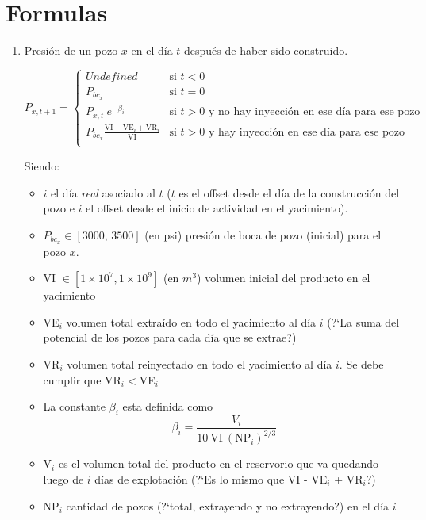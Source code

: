 \section{Formulas}

\begin{enumerate}
 \item Presi\'on de un pozo $x$ en el d\'ia $t$ despu\'es de haber sido construido. 
 
  $$
    P_{x,{t+1}} = \left\{
    \begin{array}{cl}
    \textit{Undefined}	& \mbox{si } t < 0 \\
    P_{bc_x} 		& \mbox{si } t = 0 \\
    P_{x,t} \ e^{-\beta_i}	& \mbox{si } t > 0 \text{ y no hay inyecci\'on en ese d\'ia para ese pozo} \\
    P_{bc_x} \frac{\text{VI} - \text{VE}_i + \text{VR}_i}{\text{VI}} & \mbox{si } t > 0 \text{ y hay inyecci\'on en ese d\'ia para ese pozo} \\
    \end{array}\right.
    $$

 Siendo:
 
 \begin{itemize}
  \item $i$ el d\'ia \textit{real} asociado al $t$ ($t$ es el offset desde el d\'ia de la construcci\'on del pozo e $i$ el offset desde el inicio de actividad en el yacimiento). 
  \item $P_{bc_x}\in[\text{3000, 3500}]$ (en psi) presi\'on de boca de pozo (inicial) para el pozo $x$.
  \item VI $\in[1\times 10^7, 1\times 10^9]$ (en $m^3$) volumen inicial del producto en el yacimiento
  \item VE$_i$ volumen total extra\'ido en todo el yacimiento al d\'ia $i$ (?`La suma del potencial de los pozos para cada d\'ia que se extrae?)
  \item VR$_i$ volumen total reinyectado en todo el yacimiento al d\'ia $i$. Se debe cumplir que VR$_i<$VE$_i$
  \item La constante $\beta_i$ esta definida como
  \begin{equation*}
   \beta_i = \frac{V_i}{10\ \text{VI}\ (\text{NP}_i)^{2/3}}
  \end{equation*}
  \item V$_i$ es el volumen total del producto en el reservorio que va quedando luego de $i$ d\'ias de explotaci\'on (?`Es lo mismo que VI - VE$_i$ + VR$_i$?)
  \item NP$_i$ cantidad de pozos (?`total, extrayendo y no extrayendo?) en el d\'ia $i$
 \end{itemize}


\end{enumerate}
